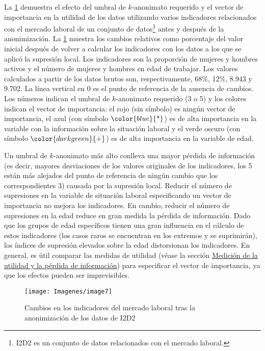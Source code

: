 \documentclass[
]{book}
\theoremstyle{definition}
\theoremstyle{definition}
\theoremstyle{definition}
\theoremstyle{definition}
\theoremstyle{remark}
\begin{document}
La \ref{fig:fig8} demuestra el efecto del umbral de \(k\)-anonimato requerido y el vector de importancia en la utilidad de los datos utilizando varios indicadores relacionados con el mercado laboral de un conjunto de datos\footnote{I2D2 es un conjunto de datos relacionados con el mercado laboral.} antes y después de la anonimización. La \ref{fig:fig8} muestra los cambios relativos como porcentaje del valor inicial después de volver a calcular los indicadores con los datos a los que se aplicó la supresión local. Los indicadores son la proporción de mujeres y hombres activos y el número de mujeres y hombres en edad de trabajar. Los valores calculados a partir de los datos brutos son, respectivamente, 68\%, 12\%, 8.943 y 9.702. La línea vertical en 0 es el punto de referencia de la ausencia de cambios. Los números indican el umbral de \(k\)-anonimato requerido (3 o 5) y los colores indican el vector de importancia: el rojo (sin símbolo) es ningún vector de importancia, el azul (con símbolo \(\color {blue}{\text{*}}\)) es de alta importancia en la variable con la información sobre la situación laboral y el verde oscuro (con símbolo \(\color {darkgreen}{\text{+}}\)) es de alta importancia en la variable de edad.

Un umbral de \(k\)-anonimato más alto conlleva una mayor pérdida de información (es decir, mayores desviaciones de los valores originales de los indicadores, los 5 están más alejados del punto de referencia de ningún cambio que los correspondientes 3) causada por la supresión local. Reducir el número de supresiones en la variable de situación laboral especificando un vector de importancia no mejora los indicadores. En cambio, reducir el número de supresiones en la edad reduce en gran medida la pérdida de información. Dado que los grupos de edad específicos tienen una gran influencia en el cálculo de estos indicadores (los casos raros se encuentran en los extremos y se suprimirán), los índices de supresión elevados sobre la edad distorsionan los indicadores. En general, es útil comparar las medidas de utilidad (véase la sección \protect\hyperlink{mediciuxf3n-de-la-utilidad-y-la-puxe9rdida-de-informaciuxf3n}{Medición de la utilidad y la pérdida de información}) para especificar el vector de importancia, ya que los efectos pueden ser imprevisibles.

\begin{figure}
\texttt{[image: Imagenes/image7]} \caption{Cambios en los indicadores del mercado laboral tras la anonimización de los datos de I2D2}\label{fig:fig8}
\end{figure}
\end{document}
